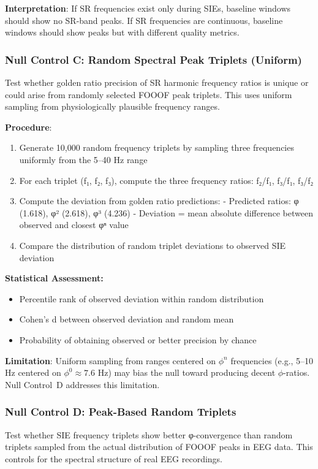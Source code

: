 \documentclass[11pt,a4paper]{article}
\begin{document}
\textbf{Interpretation}: If SR frequencies exist only during SIEs, baseline windows should show no SR-band peaks. If SR frequencies are continuous, baseline windows should show peaks but with different quality metrics.

\subsubsection{Null Control C: Random Spectral Peak Triplets (Uniform)}
Test whether golden ratio precision of SR harmonic frequency ratios is unique or could arise from randomly selected FOOOF peak triplets. This uses uniform sampling from physiologically plausible frequency ranges.

\textbf{Procedure}:
\begin{enumerate}
\item Generate 10,000 random frequency triplets by sampling three frequencies uniformly from the 5–40 Hz range
\item For each triplet (f₁, f₂, f₃), compute the three frequency ratios: f₂/f₁, f₃/f₁, f₃/f₂
\item Compute the deviation from golden ratio predictions:   - Predicted ratios: φ (1.618), φ² (2.618), φ³ (4.236)   - Deviation = mean absolute difference between observed and closest φⁿ value
\item Compare the distribution of random triplet deviations to observed SIE deviation
\end{enumerate}

\textbf{Statistical Assessment:}
\begin{itemize}
\item Percentile rank of observed deviation within random distribution
\item Cohen's d between observed deviation and random mean
\item Probability of obtaining observed or better precision by chance
\end{itemize}

\textbf{Limitation}: Uniform sampling from ranges centered on $\phi^n$ frequencies (e.g., 5--10 Hz centered on $\phi^0 \approx 7.6$ Hz) may bias the null toward producing decent $\phi$-ratios. Null Control~D addresses this limitation.

\subsubsection{Null Control D: Peak-Based Random Triplets}
Test whether SIE frequency triplets show better φ-convergence than random triplets sampled from the actual distribution of FOOOF peaks in EEG data. This controls for the spectral structure of real EEG recordings.
\end{document}
